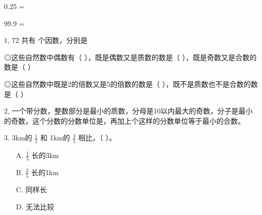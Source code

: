 \documentclass{article}
\begin{document}
\begin{CJK}{UTF8}{gbsn}

0.25  = \par  99.9   = \par
  \vspace{0.4cm}  

1, 72 共有\underline{\hspace{2cm}} 个因数，分别是 \underline{\hspace{2cm}} \par
\vspace{0.2cm}
◎这些自然数中偶数有（ ），既是偶数又是质数的数是（ ），既是奇数又是合数的数是（ ）\par
◎这些自然数中既是2的倍数又是5的倍数的数是（ ），既不是质数也不是合数的数是（ ）\par
\vspace{0.2cm}
2, 一个带分数，整数部分是最小的质数，分母是10以内最大的奇数，分子是最小的奇数，这个分数的分数单位是\underline{\hspace{2cm}}，再加上\underline{\hspace{2cm}}个这样的分数单位等于最小的合数。\par
\vspace{0.2cm}

3. 3km的 $\frac{1}{5}$ 和 1km的 $\frac{3}{5}$ 相比，（ ）。
\begin{itemize}
    \item[A.] $\frac{1}{5}$ 长的3km
    \item[B.] $\frac{3}{5}$ 长的1km
    \item[C.] 同样长
    \item[D.] 无法比较
\end{itemize}


\end{CJK}
\end{document}
